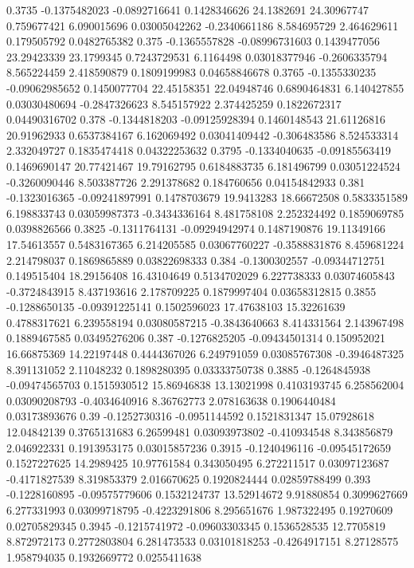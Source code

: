 {0.3735 -0.1375482023 -0.0892716641 0.1428346626 24.1382691 24.30967747 0.759677421 6.090015696 0.03005042262 -0.2340661186 8.584695729 2.464629611 0.179505792 0.0482765382
0.375 -0.1365557828 -0.08996731603 0.1439477056 23.29423339 23.1799345 0.7243729531 6.1164498 0.03018377946 -0.2606335794 8.565224459 2.418590879 0.1809199983 0.04658846678
0.3765 -0.1355330235 -0.09062985652 0.1450077704 22.45158351 22.04948746 0.6890464831 6.140427855 0.03030480694 -0.2847326623 8.545157922 2.374425259 0.1822672317 0.04490316702
0.378 -0.1344818203 -0.09125928394 0.1460148543 21.61126816 20.91962933 0.6537384167 6.162069492 0.03041409442 -0.306483586 8.524533314 2.332049727 0.1835474418 0.04322253632
0.3795 -0.1334040635 -0.09185563419 0.1469690147 20.77421467 19.79162795 0.6184883735 6.181496799 0.03051224524 -0.3260090446 8.503387726 2.291378682 0.184760656 0.04154842933
0.381 -0.1323016365 -0.09241897991 0.1478703679 19.9413283 18.66672508 0.5833351589 6.198833743 0.03059987373 -0.3434336164 8.481758108 2.252324492 0.1859069785 0.0398826566
0.3825 -0.1311764131 -0.09294942974 0.1487190876 19.11349166 17.54613557 0.5483167365 6.214205585 0.03067760227 -0.3588831876 8.459681224 2.214798037 0.1869865889 0.03822698333
0.384 -0.1300302557 -0.09344712751 0.149515404 18.29156408 16.43104649 0.5134702029 6.227738333 0.03074605843 -0.3724843915 8.437193616 2.178709225 0.1879997404 0.03658312815
0.3855 -0.1288650135 -0.09391225141 0.1502596023 17.47638103 15.32261639 0.4788317621 6.239558194 0.03080587215 -0.3843640663 8.414331564 2.143967498 0.1889467585 0.03495276206
0.387 -0.1276825205 -0.09434501314 0.150952021 16.66875369 14.22197448 0.4444367026 6.249791059 0.03085767308 -0.3946487325 8.391131052 2.11048232 0.1898280395 0.03333750738
0.3885 -0.1264845938 -0.09474565703 0.1515930512 15.86946838 13.13021998 0.4103193745 6.258562004 0.03090208793 -0.4034640916 8.36762773 2.078163638 0.1906440484 0.03173893676
0.39 -0.1252730316 -0.0951144592 0.1521831347 15.07928618 12.04842139 0.3765131683 6.26599481 0.03093973802 -0.410934548 8.343856879 2.046922331 0.1913953175 0.03015857236
0.3915 -0.1240496116 -0.09545172659 0.1527227625 14.2989425 10.97761584 0.343050495 6.272211517 0.03097123687 -0.4171827539 8.319853379 2.016670625 0.1920824444 0.02859788499
0.393 -0.1228160895 -0.09575779606 0.1532124737 13.52914672 9.91880854 0.3099627669 6.277331993 0.03099718795 -0.4223291806 8.295651676 1.987322495 0.19270609 0.02705829345
0.3945 -0.1215741972 -0.09603303345 0.1536528535 12.7705819 8.872972173 0.2772803804 6.281473533 0.03101818253 -0.4264917151 8.27128575 1.958794035 0.1932669772 0.0255411638
}

